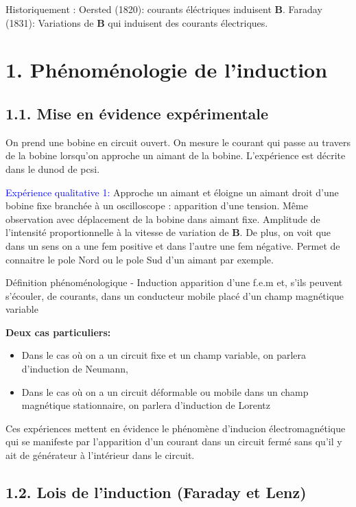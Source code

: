 \documentclass[french, a4paper, 10pt, twocolumn, landscape]{article}
\begin{document}
  Historiquement : Oersted (1820): courants éléctriques induisent $\mathbf B$. Faraday (1831): Variations de $\mathbf B$ qui induisent des courants électriques. 

  \section*{1. Phénoménologie de l'induction}

  \subsection*{1.1. Mise en évidence expérimentale}



 On prend une bobine en circuit ouvert. On mesure le courant qui passe au travers de la bobine lorsqu'on approche un aimant de la bobine.  L'expérience est décrite dans le dunod de pcsi.

  \textcolor{blue}{Expérience qualitative 1:} Approche un aimant et éloigne un aimant droit d'une bobine fixe branchée à un oscilloscope : apparition d'une tension. Même observation avec déplacement de la bobine dans aimant fixe. Amplitude de l'intensité proportionnelle à la vitesse de variation de $\mathbf B$. De plus, on voit que dans un sens on a une fem positive et dans l'autre une fem négative. Permet de connaitre le pole Nord ou le pole Sud d'un aimant par exemple.


  \begin{definition}{Définition phénoménologique - Induction}
    apparition d'une f.e.m et, s'ils peuvent s'écouler, de courants, dans un conducteur mobile placé d'un champ magnétique variable
  \end{definition}

  \textbf{Deux cas particuliers:} \begin{itemize}
    \item Dans le cas où on a un circuit fixe et un champ variable, on parlera d'induction de Neumann,
    \item Dans le cas où on a un circuit déformable ou mobile dans un champ magnétique stationnaire, on parlera d'induction de Lorentz
\end{itemize}

Ces expériences mettent en évidence le phénomène d'inducion électromagnétique qui se manifeste par l'apparition d'un courant dans un circuit fermé sans qu'il y ait de générateur à l'intérieur dans le circuit. 

\subsection*{1.2. Lois de l'induction (Faraday et Lenz)}
\end{document}
